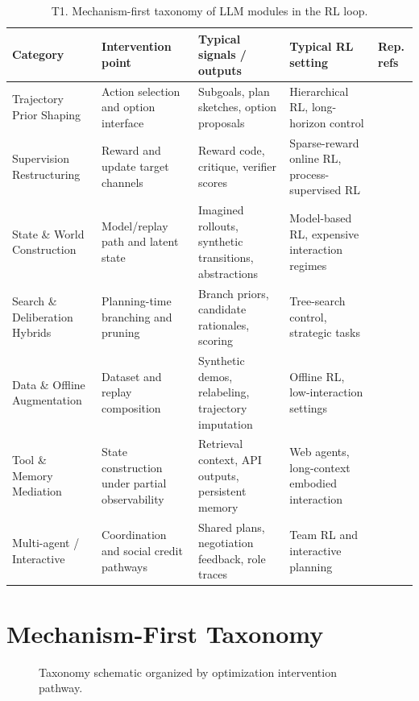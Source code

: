 \documentclass[pdflatex,sn-mathphys-num]{sn-jnl}
\begin{document}
\begin{table}[t]
\centering
\small
\setlength{\tabcolsep}{4pt}
\begin{tabularx}{\textwidth}{P{2.3cm}P{2.5cm}P{2.8cm}P{2.4cm}Y}
\toprule
\textbf{Category} & \textbf{Intervention point} & \textbf{Typical signals / outputs} & \textbf{Typical RL setting} & \textbf{Rep. refs}\\
\midrule
Trajectory Prior Shaping & Action selection and option interface & Subgoals, plan sketches, option proposals & Hierarchical RL, long-horizon control & \cite{arxiv_p_2204_01691,arxiv_p_2602_16165}\\
Supervision Restructuring & Reward and update target channels & Reward code, critique, verifier scores & Sparse-reward online RL, process-supervised RL & \cite{arxiv_p_2310_12931,arxiv_p_2602_12579}\\
State \& World Construction & Model/replay path and latent state & Imagined rollouts, synthetic transitions, abstractions & Model-based RL, expensive interaction regimes & \cite{arxiv_p_2301_12050,arxiv_p_2602_02454}\\
Search \& Deliberation Hybrids & Planning-time branching and pruning & Branch priors, candidate rationales, scoring & Tree-search control, strategic tasks & \cite{arxiv_p_2602_07848,doi_p_10_48448_q4pk_2g71}\\
Data \& Offline Augmentation & Dataset and replay composition & Synthetic demos, relabeling, trajectory imputation & Offline RL, low-interaction settings & \cite{arxiv_p_2310_20587,arxiv_p_2601_08107}\\
Tool \& Memory Mediation & State construction under partial observability & Retrieval context, API outputs, persistent memory & Web agents, long-context embodied interaction & \cite{arxiv_p_2404_03648,arxiv_p_2511_14460}\\
Multi-agent / Interactive & Coordination and social credit pathways & Shared plans, negotiation feedback, role traces & Team RL and interactive planning & \cite{arxiv_p_2304_07297,arxiv_p_2602_08335}\\
\bottomrule
\end{tabularx}
\caption{T1. Mechanism-first taxonomy of LLM modules in the RL loop.}
\label{tab:t1_taxonomy}
\end{table}

\section{Mechanism-First Taxonomy}
\begin{figure}[t]
\centering
\resizebox{0.95\textwidth}{!}{}
\caption{Taxonomy schematic organized by optimization intervention pathway.}
\label{fig:taxonomy}
\end{figure}
\end{document}
